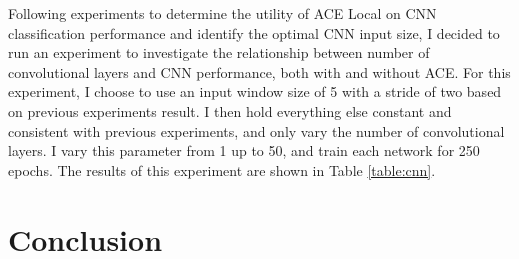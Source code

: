 \documentclass[12pt]{article}
\begin{document}
Following experiments to determine the utility of ACE Local on CNN classification performance and identify the optimal CNN input size, I decided to run an experiment to investigate the relationship between number of convolutional layers and CNN performance, both with and without ACE.
%
For this experiment, I choose to use an input window size of 5 with a stride of two based on previous experiments result.
%
I then hold everything else constant and consistent with previous experiments, and only vary the number of convolutional layers.
%
I vary this parameter from 1 up to 50, and train each network for 250 epochs.
%
The results of this experiment are shown in Table \ref{table:cnn}.

\section{Conclusion}\label{sec:conclusion}


\newpage
 

\end{document}
